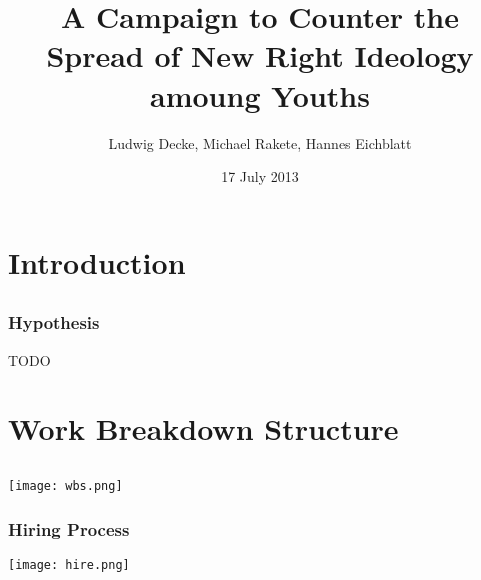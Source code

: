\documentclass{beamer}
\title{A Campaign to Counter the Spread of New Right Ideology amoung Youths}
\institute{English in Project Management\\Sprachenzentrum der Universität Leipzig}
\author{Ludwig Decke, Michael Rakete, Hannes Eichblatt}
\date{17 July 2013}
\begin{document}

\frame[plain]{\maketitle}

\section{Introduction}
\subsection{}

\begin{frame}
 \frametitle{Hypothesis}
 \begin{block}{TODO}
 \end{block}
\end{frame}

\section{Work Breakdown Structure}
\subsection{}
\begin{frame}
  \texttt{[image: wbs.png]}
\end{frame}
\begin{frame}
  \frametitle{Hiring Process}
  \texttt{[image: hire.png]}
\end{frame}
\end{document}
